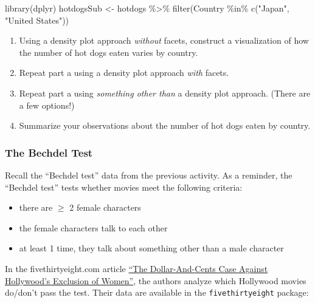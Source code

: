\documentclass[
  letterpaper,
  DIV=11,
  numbers=noendperiod]{scrreprt}
\newenvironment{Shaded}{\begin{snugshade}}{\end{snugshade}}
\newcommand{\FunctionTok}[1]{\textcolor[rgb]{0.28,0.35,0.67}{#1}}
\newcommand{\NormalTok}[1]{\textcolor[rgb]{0.00,0.23,0.31}{#1}}
\newcommand{\OtherTok}[1]{\textcolor[rgb]{0.00,0.23,0.31}{#1}}
\newcommand{\SpecialCharTok}[1]{\textcolor[rgb]{0.37,0.37,0.37}{#1}}
\newcommand{\StringTok}[1]{\textcolor[rgb]{0.13,0.47,0.30}{#1}}
\providecommand{\tightlist}{%
  \setlength{\itemsep}{0pt}\setlength{\parskip}{0pt}}\usepackage{longtable,booktabs,array}
\begin{document}
\begin{Shaded}
\begin{Highlighting}[]
\FunctionTok{library}\NormalTok{(dplyr)}
\NormalTok{hotdogsSub }\OtherTok{\textless{}{-}}\NormalTok{ hotdogs }\SpecialCharTok{\%\textgreater{}\%}
  \FunctionTok{filter}\NormalTok{(Country }\SpecialCharTok{\%in\%} \FunctionTok{c}\NormalTok{(}\StringTok{"Japan"}\NormalTok{, }\StringTok{"United States"}\NormalTok{))}
\end{Highlighting}
\end{Shaded}

\begin{enumerate}
\def\labelenumi{\alph{enumi}.}
\tightlist
\item
  Using a density plot approach \emph{without} facets, construct a
  visualization of how the number of hot dogs eaten varies by country.
\item
  Repeat part a using a density plot approach \emph{with} facets.\\
\item
  Repeat part a using \emph{something other than} a density plot
  approach. (There are a few options!)\\
\item
  Summarize your observations about the number of hot dogs eaten by
  country.
\end{enumerate}

\subsubsection*{The Bechdel Test}\label{the-bechdel-test}

Recall the ``Bechdel test'' data from the previous activity. As a
reminder, the ``Bechdel test'' tests whether movies meet the following
criteria:

\begin{itemize}
\tightlist
\item
  there are \(\ge\) 2 female characters\\
\item
  the female characters talk to each other\\
\item
  at least 1 time, they talk about something other than a male character
\end{itemize}

In the fivethirtyeight.com article
\href{http://fivethirtyeight.com/features/the-dollar-and-cents-case-against-hollywoods-exclusion-of-women/}{``The
Dollar-And-Cents Case Against Hollywood's Exclusion of Women''}, the
authors analyze which Hollywood movies do/don't pass the test. Their
data are available in the \texttt{fivethirtyeight} package:
\end{document}
